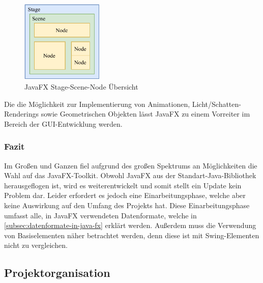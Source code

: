 \begin{figure}[H]
    \centering
    \includegraphics[width=0.35\textwidth]{fig/ainf/JavaFXStageSceneNode.pdf}
    \caption{JavaFX Stage-Scene-Node Übersicht}
    \label{fig:Stage-Scene-Node}
\end{figure}
Die die Möglichkeit zur Implementierung von Animationen, Licht/Schatten-Renderings sowie Geometrischen Objekten lässt JavaFX zu einem Vorreiter im Bereich der GUI-Entwicklung werden.
\subsubsection{Fazit}
Im Großen und Ganzen fiel aufgrund des großen Spektrums an Möglichkeiten die Wahl auf das JavaFX-Toolkit.
Obwohl JavaFX aus der Standart-Java-Bibliothek herausgeflogen ist, wird es weiterentwickelt und somit stellt ein Update kein Problem dar.
Leider erfordert es jedoch eine Einarbeitungsphase, welche aber keine Auswirkung auf den Umfang des Projekts hat.
Diese Einarbeitungsphase umfasst alle, in JavaFX verwendeten Datenformate, welche in \autoref{subsec:datenformate-in-java-fx} erklärt werden.
Außerdem muss die Verwendung von Basiselementen näher betrachtet werden, denn diese ist mit Swing-Elementen nicht zu vergleichen.
\subsection{Projektorganisation}\label{subsec:projektorganisation}
